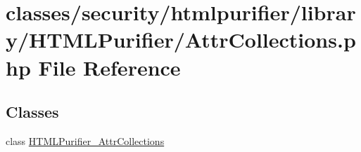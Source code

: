 \hypertarget{AttrCollections_8php}{\section{classes/security/htmlpurifier/library/\+H\+T\+M\+L\+Purifier/\+Attr\+Collections.php File Reference}
\label{AttrCollections_8php}
}
\subsection*{Classes}
\begin{DoxyCompactItemize}
\item 
class \hyperlink{classHTMLPurifier__AttrCollections}{H\+T\+M\+L\+Purifier\+\_\+\+Attr\+Collections}
\end{DoxyCompactItemize}
